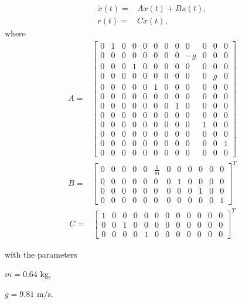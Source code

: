 \begin{align*}
\dot{x}(t)= & Ax(t)+Bu(t),\\
r(t)= & Cx(t),
\end{align*}
where
\begin{align*}
A  = & 
\begin{bmatrix}
0 & 1 & 0 & 0 & 0 & 0 & 0 & 0 & 0 & 0 & 0 & 0\\
0 & 0 & 0 & 0 & 0 & 0 & 0 & 0 & -g & 0 & 0 & 0\\
0 & 0 & 0 & 1 & 0 & 0 & 0 & 0 & 0 & 0 & 0 & 0\\
0 & 0 & 0 & 0 & 0 & 0 & 0 & 0 & 0 & 0 & g & 0\\
0 & 0 & 0 & 0 & 0 & 1 & 0 & 0 & 0 & 0 & 0 & 0\\
0 & 0 & 0 & 0 & 0 & 0 & 0 & 0 & 0 & 0 & 0 & 0\\
0 & 0 & 0 & 0 & 0 & 0 & 0 & 1 & 0 & 0 & 0 & 0\\
0 & 0 & 0 & 0 & 0 & 0 & 0 & 0 & 0 & 0 & 0 & 0\\
0 & 0 & 0 & 0 & 0 & 0 & 0 & 0 & 0 & 1 & 0 & 0\\
0 & 0 & 0 & 0 & 0 & 0 & 0 & 0 & 0 & 0 & 0 & 0\\
0 & 0 & 0 & 0 & 0 & 0 & 0 & 0 & 0 & 0 & 0 & 1\\
0 & 0 & 0 & 0 & 0 & 0 & 0 & 0 & 0 & 0 & 0 & 0
\end{bmatrix}
\end{align*}
\begin{align*}
B = & 
\begin{bmatrix}
0 & 0 & 0 & 0 & 0 & \frac{1}{m} & 0 & 0 & 0 & 0 & 0 & 0\\
0 & 0 & 0 & 0 & 0 & 0 & 0 & 1 & 0 & 0 & 0 & 0\\
0 & 0 & 0 & 0 & 0 & 0 & 0 & 0 & 0 & 1 & 0 & 0\\
0 & 0 & 0 & 0 & 0 & 0 & 0 & 0 & 0 & 0 & 0 & 1
\end{bmatrix}^T
\end{align*}
%
\begin{align*}
C  = & 
\begin{bmatrix}
1 & 0 & 0 & 0 & 0 & 0 & 0 & 0 & 0 & 0 & 0 & 0\\
0 & 0 & 1 & 0 & 0 & 0 & 0 & 0 & 0 & 0 & 0 & 0\\
0 & 0 & 0 & 0 & 1 & 0 & 0 & 0 & 0 & 0 & 0 & 0
\end{bmatrix}^T
\end{align*}

with the parameters  

$m=0.64 $ kg, 

$g=9.81$ m/s.


